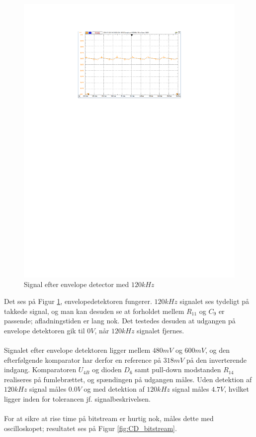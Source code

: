 \begin{figure}[h]
	\centering
	\includegraphics[width={\textwidth},trim=158 520 150 80, clip=true]{../Implementering/billeder/efter_envelope.pdf}
	\caption{Signal efter envelope detector med $120 kHz$}
	\label{fig:CD_efter_envelope}
\end{figure}
\newpage
Det ses på Figur \ref{fig:CD_efter_envelope}, envelopedetektoren fungerer. $120 kHz$ signalet ses tydeligt på takkede signal, og man kan desuden se at forholdet mellem $R_{11}$ og $C_{9}$ er passende; afladningstiden er lang nok. Det testedes desuden at udgangen på envelope detektoren gik til $0V$, når $120 kHz$ signalet fjernes.\\
\\
Signalet efter envelope detektoren ligger mellem $480 mV$ og $600 mV$, og den efterfølgende komparator \cite{lib:TS912} har derfor en reference på $318 mV$ på den inverterende indgang. Komparatoren $U_{4B}$ og dioden $D_{6}$ samt pull-down modstanden $R_{14}$ realiseres på fumlebrættet, og spændingen på udgangen måles. Uden detektion af $120 kHz$ signal måles $0.0V$ og med detektion af $120 kHz$ signal måles $4.7 V$, hvilket ligger inden for tolerancen jf. signalbeskrivelsen.\\
\\
For at sikre at rise time på bitstream er hurtig nok, måles dette med oscilloskopet; resultatet ses på Figur \ref{fig:CD_bitstream}.
 
